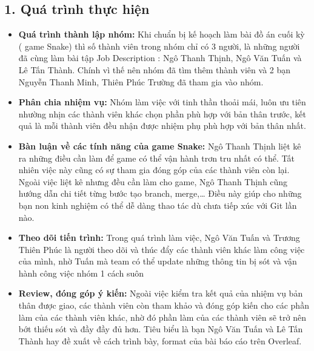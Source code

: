\documentclass[12pt]{report}
\begin{document}
\subsection*{1. Quá trình thực hiện}
\begin{itemize}
    \item \textbf{Quá trình thành lập nhóm:} Khi chuẩn bị kế hoạch làm bài đồ án cuối kỳ ( game Snake) thì số thành viên trong nhóm chỉ có 3 người, là những người đã cùng làm bài tập Job Description : Ngô Thanh Thịnh, Ngô Văn Tuấn và Lê Tấn Thành. Chính vì thế nên nhóm đã tìm thêm thành viên và 2 bạn Nguyễn Thanh Minh, Thiên Phúc Trường đã tham gia vào nhóm. 
     \item \textbf{Phân chia nhiệm vụ:} Nhóm làm việc với tinh thần thoải mái, luôn ưu tiên nhường nhịn các thành viên khác chọn phần phù hợp với bản thân trước, kết quả là mỗi thành viên đều nhận được nhiệm phụ phù hợp với bản thân nhất.
      \item \textbf{Bàn luận về các tính năng của game Snake:} Ngô Thanh Thịnh liệt kê ra những điều cần làm để game có thể vận hành trơn tru nhất có thể. Tất nhiên việc này cũng có sự tham gia đóng góp của các thành viên còn lại. Ngoài việc liệt kê nhưng đều cần làm cho game, Ngô Thanh Thịnh cũng hướng dẫn chi tiết từng bước tạo branch, merge,… Điều này giúp cho những bạn non kinh nghiệm có thể dễ dàng thao tác dù chưa tiếp xúc với Git lần nào.
       \item \textbf{Theo dõi tiến trình:} Trong quá trình làm việc, Ngô Văn Tuấn và Trương Thiên Phúc là người theo dõi và thúc đẩy các thành viên khác làm công việc của mình, nhờ Tuấn mà team có thể update những thông tin bị sót và vận hành công việc nhóm 1 cách suôn
       \item \textbf{Review, đóng góp ý kiến:} Ngoài việc kiểm tra kết quả của nhiệm vụ bản thân được giao, các thành viên còn tham khảo và đóng góp kiến cho các phần làm của các thành viên khác, nhờ đó phần làm của các thành viên sẽ trở nên bớt thiếu sót và đầy đầy đủ hơn. Tiêu biểu là bạn Ngô Văn Tuấn và Lê Tấn Thành hay đề xuất về cách trình bày, format của bài báo cáo trên Overleaf.

       \end{itemize}

       
\end{document}
